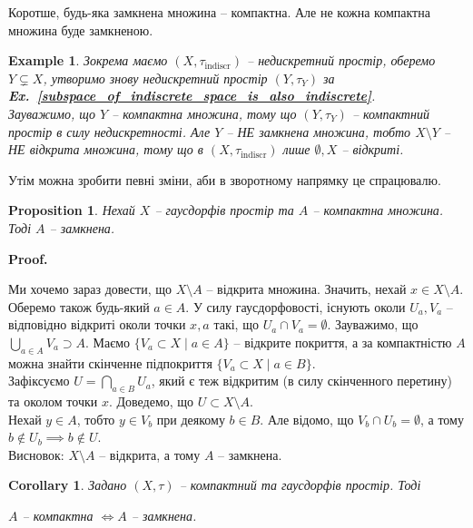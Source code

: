 \documentclass[a4paper, 10pt]{article}
\makeatletter
\theoremstyle{theoremdd}
\newtheorem{example}[theorem]{Example}
\newtheorem{proposition}[theorem]{Proposition}
\newtheorem{corollary}[theorem]{Corollary}
\newcommand\exref[1]{\textbf{Ex.~\ref{#1}}}
\renewenvironment{proof}[1][Proof.\\]{\par
\pushQED{\hfill \qed}%
\normalfont \topsep6\p@\@plus6\p@\relax
\trivlist
\item\relax
{\bfseries
#1\@addpunct{.}}\hspace\labelsep\ignorespaces
}{%
\popQED\endtrivlist\@endpefalse
}
\makeatother
\begin{document}
\noindent Коротше, будь-яка замкнена множина -- компактна. Але не кожна компактна множина буде замкненою.

\begin{example}
Зокрема маємо $(X,\tau_{\text{indiscr}})$ -- недискретний простір, оберемо $Y \subsetneq X$, утворимо знову недискретний простір $(Y,\tau_Y)$ за \exref{subspace_of_indiscrete_space_is_also_indiscrete}.\\
Зауважимо, що $Y$ -- компактна множина, тому що $(Y,\tau_Y)$ -- компактний простір в силу недискретності. Але $Y$ -- НЕ замкнена множина, тобто $X \setminus Y$ -- НЕ відкрита множина, тому що в $(X,\tau_{\text{indiscr}})$ лише $\emptyset,X$ -- відкриті.
\end{example}
\noindent
Утім можна зробити певні зміни, аби в зворотному напрямку це спрацювалю.

\begin{proposition}
Нехай $X$ -- гаусдорфів простір та $A$ -- компактна множина. Тоді $A$ -- замкнена.
\end{proposition}

\begin{proof}
Ми хочемо зараз довести, що $X \setminus A$ -- відкрита множина. Значить, нехай $x \in X \setminus A$. Оберемо також будь-який $a \in A$. У силу гаусдорфовості, існують околи $U_a,V_a$ -- відповідно відкриті околи точки $x,a$ такі, що $U_a \cap V_a = \emptyset$. Зауважимо, що $\displaystyle\bigcup_{a \in A} V_a \supset A$. Маємо $\{V_a \subset X\mid a \in A\}$ -- відкрите покриття, а за компактністю $A$ можна знайти скінченне підпокриття $\{V_a \subset X\mid a \in B\}$.\\
Зафіксуємо $U = \displaystyle\bigcap_{a \in B} U_a$, який є теж відкритим (в силу скінченного перетину) та околом точки $x$. Доведемо, що $U \subset X \setminus A$.\\
Нехай $y \in A$, тобто $y \in V_b$ при деякому $b \in B$. Але відомо, що $V_b \cap U_b = \emptyset$, а тому $b \notin U_b \implies b \notin U$.\\
Висновок: $X \setminus A$ -- відкрита, а тому $A$ -- замкнена.
\end{proof}

\begin{corollary}
Задано $(X,\tau)$ -- компактний та гаусдорфів простір. Тоді
\begin{center}
$A$ -- компактна $\iff A$ -- замкнена.
\end{center}
\end{corollary}
\end{document}
